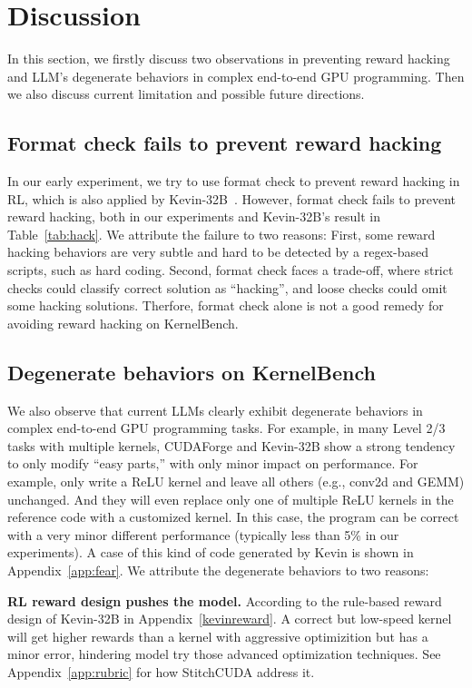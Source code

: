 \section{Discussion}
\label{sec:discuss}
In this section, we firstly discuss two observations in preventing reward hacking and LLM's degenerate behaviors in complex end-to-end GPU programming. Then we also discuss current limitation and possible future directions.

\subsection{Format check fails to prevent reward hacking}
In our early experiment, we try to use format check to prevent reward hacking in RL, which is also applied by Kevin-32B~\cite{kevin}. However, format check fails to prevent reward hacking, both in our experiments and Kevin-32B's result in Table~\ref{tab:hack}. We attribute the failure to two reasons: First, some reward hacking behaviors are very subtle and hard to be detected by a regex-based scripts, such as hard coding. Second, format check faces a trade-off, where strict checks could classify correct solution as “hacking”, and loose checks could omit some hacking solutions. Therfore, format check alone is not a good remedy for avoiding reward hacking on KernelBench. 



\subsection{Degenerate behaviors on KernelBench}
We also observe that current LLMs clearly exhibit degenerate behaviors in complex end-to-end GPU programming tasks. For example, in many Level 2/3 tasks with multiple kernels, CUDAForge and Kevin-32B show a strong tendency to only modify “easy parts,” with only minor impact on performance. For example, only write a ReLU kernel and leave all others (e.g., conv2d and GEMM) unchanged.  And they will even replace only one of multiple ReLU kernels in the reference code with a customized kernel. In this case, the program can be correct with a very minor different performance (typically less than 5\% in our experiments). A case of this kind of code generated by Kevin is shown in Appendix~\ref{app:fear}. We attribute the degenerate behaviors to two reasons:

\textbf{RL reward design pushes the model.} According to the rule-based reward design of Kevin-32B in Appendix~\ref{kevinreward}. A correct but low-speed kernel will get higher rewards than a kernel with aggressive optimizition but has a minor error, hindering model try those advanced optimization techniques. See Appendix~\ref{app:rubric} for how StitchCUDA address it.

